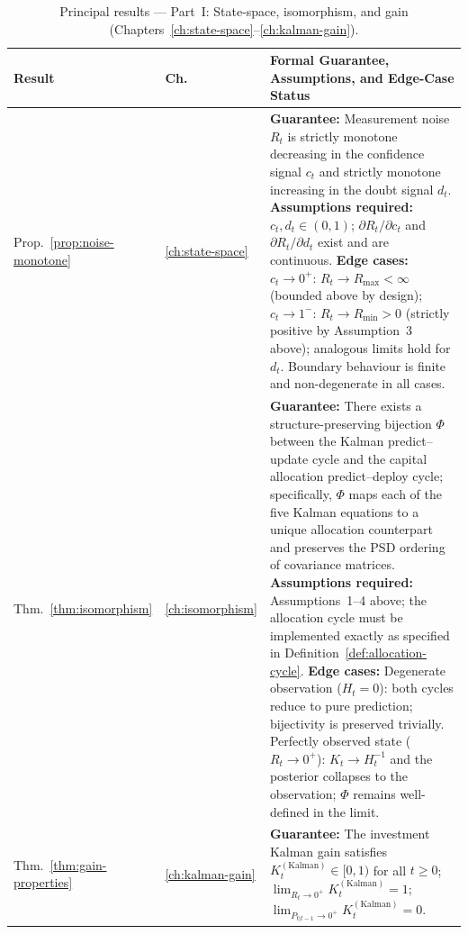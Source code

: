 \documentclass[12pt,openany]{book}
\numberwithin{equation}{chapter}
\theoremstyle{plain}
\theoremstyle{definition}
\theoremstyle{remark}
\begin{document}
\begin{table}[H]
\centering
\caption{Principal results --- Part~I: State-space, isomorphism,
         and gain (Chapters~\ref{ch:state-space}--\ref{ch:kalman-gain}).}
\label{tab:summary-a}
\small
\begin{tabularx}{\linewidth}{@{} l l X @{}}
\toprule
\textbf{Result} & \textbf{Ch.} & \textbf{Formal Guarantee,
  Assumptions, and Edge-Case Status} \\
\midrule
Prop.~\ref{prop:noise-monotone}
  & \ref{ch:state-space}
  & \textbf{Guarantee:} Measurement noise $R_t$ is strictly
    monotone decreasing in the confidence signal $c_t$ and strictly
    monotone increasing in the doubt signal $d_t$.
    \newline
    \textbf{Assumptions required:} $c_t, d_t \in (0,1)$;
    $\partial R_t/\partial c_t$ and $\partial R_t/\partial d_t$
    exist and are continuous.
    \newline
    \textbf{Edge cases:} $c_t \to 0^+$: $R_t \to R_{\max} < \infty$
    (bounded above by design); $c_t \to 1^-$: $R_t \to R_{\min} > 0$
    (strictly positive by Assumption~3 above); analogous limits hold
    for $d_t$.  Boundary behaviour is finite and non-degenerate in
    all cases. \\
\midrule
Thm.~\ref{thm:isomorphism}
  & \ref{ch:isomorphism}
  & \textbf{Guarantee:} There exists a structure-preserving bijection
    $\Phi$ between the Kalman predict--update cycle and the capital
    allocation predict--deploy cycle; specifically,
    $\Phi$ maps each of the five Kalman equations to a unique
    allocation counterpart and preserves the PSD ordering of
    covariance matrices.
    \newline
    \textbf{Assumptions required:} Assumptions~1--4 above; the
    allocation cycle must be implemented exactly as specified in
    Definition~\ref{def:allocation-cycle}.
    \newline
    \textbf{Edge cases:} Degenerate observation ($H_t = 0$): both
    cycles reduce to pure prediction; bijectivity is preserved
    trivially.  Perfectly observed state ($R_t \to 0^+$): $K_t \to
    H_t^{-1}$ and the posterior collapses to the observation;
    $\Phi$ remains well-defined in the limit. \\
\midrule
Thm.~\ref{thm:gain-properties}
  & \ref{ch:kalman-gain}
  & \textbf{Guarantee:} The investment Kalman gain satisfies
    $K_t^{(\mathrm{Kalman})} \in [0,1)$ for all $t \ge 0$;
    $\lim_{R_t \to 0^+} K_t^{(\mathrm{Kalman})} = 1$;
    $\lim_{P_{t|t-1} \to 0^+} K_t^{(\mathrm{Kalman})} = 0$.

\end{tabularx}
\end{table}
\end{document}
